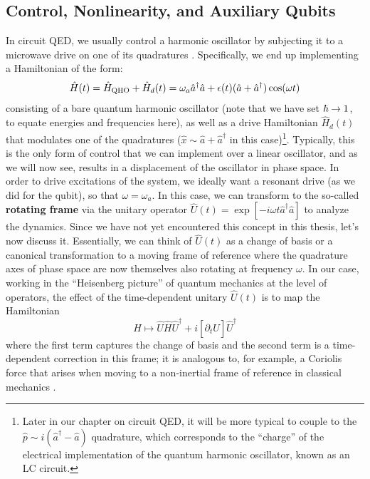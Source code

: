 \subsection{Control, Nonlinearity, and Auxiliary Qubits\label{sec:2_control_nonlinearity_drive}}
In circuit QED, we usually control a harmonic oscillator by subjecting it to a microwave drive on one of its quadratures \cite{manenti2023quantum}. Specifically, we end up implementing a Hamiltonian of the form:
\begin{equation}
    \hat{H}(t) = \hat{H}_{\rm QHO} + \hat{H}_d(t) = \omega_a \hat{a}^\dagger \hat{a} + \epsilon(t)(\hat{a} + \hat{a}^\dagger)\cos(\omega t)
    \label{eq:2_oscillator_drive}
\end{equation}
consisting of a bare quantum harmonic oscillator (note that we have set $\hbar \to 1$, to equate energies and frequencies here), as well as a drive Hamiltonian $\hat{H}_d(t)$ that modulates one of the quadratures ($\hat{x} \sim \hat{a} + \hat{a}^\dagger$ in this case)\footnote{Later in our chapter on circuit QED, it will be more typical to couple to the $\hat{p} \sim i(\hat{a}^\dagger - \hat{a})$ quadrature, which corresponds to the ``charge'' of the electrical implementation of the quantum harmonic oscillator, known as an LC circuit.}. Typically, this is the only form of control that we can implement over a linear oscillator, and as we will now see, results in a displacement of the oscillator in phase space. In order to drive excitations of the system, we ideally want a resonant drive (as we did for the qubit), so that $\omega = \omega_a$. In this case, we can transform to the so-called \textbf{rotating frame} via the unitary operator $\hat{U}(t) = \exp[-i\omega t\hat{a}^\dagger \hat{a}]$ to analyze the dynamics. Since we have not yet encountered this concept in this thesis, let's now discuss it. Essentially, we can think of $\hat{U}(t)$ as a change of basis or a canonical transformation to a moving frame of reference where the quadrature axes of phase space are now themselves also rotating at frequency $\omega$. In our case, working in the ``Heisenberg picture'' of quantum mechanics at the level of operators, the effect of the time-dependent unitary $\hat{U}(t)$ is to map the Hamiltonian
\begin{equation}
    \hat{H} \mapsto \hat{U} \hat{H} \hat{U}^\dagger + i[\partial_t \hat{U}]\hat{U}^\dagger
\end{equation}
where the first term captures the change of basis and the second term is a time-dependent correction in this frame; it is analogous to, for example, a Coriolis force that arises when moving to a non-inertial frame of reference in classical mechanics \cite{goldstein-classical-mechanics}. 

